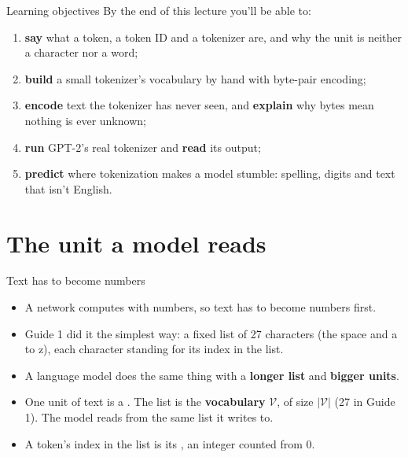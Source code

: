 \documentclass[aspectratio=169,11pt,t,\primeropts]{beamer}
\begin{document}
\begin{frame}{Learning objectives}
  By the end of this lecture you'll be able to:
  \begin{enumerate}
    \item \textbf{say} what a token, a token ID and a tokenizer are, and why the unit is neither
      a character nor a word;
    \item \textbf{build} a small tokenizer's vocabulary by hand with byte-pair encoding;
    \item \textbf{encode} text the tokenizer has never seen, and \textbf{explain} why bytes mean
      nothing is ever unknown;
    \item \textbf{run} GPT-2's real tokenizer and \textbf{read} its output;
    \item \textbf{predict} where tokenization makes a model stumble: spelling, digits and text
      that isn't English.
  \end{enumerate}
\end{frame}

\section{The unit a model reads}

\begin{frame}{Text has to become numbers}
  \begin{itemize}
    \item A network computes with numbers, so text has to become numbers first.
    \item Guide 1 did it the simplest way: a fixed list of 27 characters (the space and a to z),
      each character standing for its index in the list.
    \item A language model does the same thing with a \textbf{longer list} and \textbf{bigger
      units}.
  \end{itemize}
  \pause
  \vspace{2mm}
  \begin{itemize}
    \item One unit of text is a . The list is the \textbf{vocabulary} $\mathcal{V}$,
      of size $\lvert\mathcal{V}\rvert$ (27 in Guide 1). The model reads from the same list it
      writes to.
    \item A token's index in the list is its , an integer counted from 0.
  \end{itemize}
\end{frame}
\end{document}
